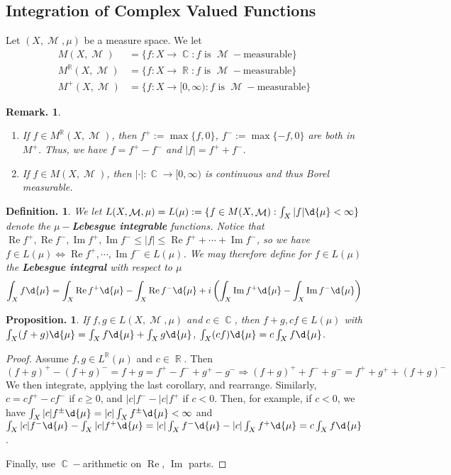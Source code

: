 \documentclass[11pt, a4paper]{memoir}
\DeclareMathOperator{\R}{{\mathbb{R}}}
\DeclareMathOperator{\C}{{\mathbb{C}}}
\theoremstyle{change}
\newtheorem{proposition}[theorem]{Proposition.}
\theoremstyle{plain}
\theoremstyle{nonumberplain}
\newtheorem{definition}{Definition.}
\newtheorem{remark}{Remark.}
\newtheorem{proof}{Proof}
\DeclareMathOperator{\M}{{\mathcal{M}}}
\renewcommand{\Re}{\ensuremath{\operatorname{Re}}}
\renewcommand{\Im}{\ensuremath{\operatorname{Im}}}
\begin{document}
\subsection{Integration of Complex Valued Functions}
Let $(X,\M,\mu)$ be a measure space.
We let
\begin{align*}
    M(X,\M)&=\{f:X\to\C:f\text{ is $\M-$measurable}\}\\
    M^{\R}(X,\M)&=\{f:X\to\R:f\text{ is $\M-$measurable}\}\\
    M^+(X,\M)&=\{f:X\to[0,\infty):f\text{ is $\M-$measurable}\}
\end{align*}
\begin{remark}
    \begin{enumerate}
        \item If $f\in M^{\R}(X,\M)$, then $f^+:=\max\{f,0\}$, $f^-:=\max\{-f,0\}$ are both in $M^+$.
            Thus, we have $f=f^+-f^-$ and $|f|=f^++f^-$.
        \item If $f\in M(X,\M)$, then $|\cdot|:\C\to[0,\infty)$ is continuous and thus Borel measurable. %
    \end{enumerate}
\end{remark}
\begin{definition}
    We let $L(X,\M,\mu)=L(\mu):=\{f\in M(X,\M):\int_X|f|\d{\mu}<\infty\}$ denote the \textbf{$\mu-$Lebesgue integrable} functions.
    Notice that $\Re f^+,\Re f^-,\Im f^+,\Im f^-\leq |f|\leq\Re f^++\cdots+\Im f^-$, so we have $f\in L(\mu)\Leftrightarrow \Re f^+,\cdots,\Im f^-\in L(\mu)$.
    We may therefore define for $f\in L(\mu)$ the \textbf{Lebesgue integral} with respect to $\mu$
    \begin{equation*}
        \int_X f\d{\mu}=\int_X\Re f^+\d{\mu}-\int_X\Re f^-\d{\mu}+i\left(\int_X\Im f^+\d{\mu}-\int_X\Im f^-\d{\mu}\right)
    \end{equation*}
\end{definition}
\begin{proposition}
    If $f,g\in L(X,\M,\mu)$ and $c\in\C$, then $f+g,cf\in L(\mu)$ with $\int_X(f+g)\d{\mu}=\int_X f\d{\mu}+\int_X g\d{\mu}$, $\int_X(cf)\d{\mu}=c\int_X f\d{\mu}$.
\end{proposition}
\begin{proof}
    Assume $f,g\in L^{\R}(\mu)$ and $c\in\R$.
    Then
    \begin{equation*}
        (f+g)^+-(f+g)^-=f+g=f^+-f^-+g^+-g^-\Rightarrow(f+g)^++f^-+g^-=f^++g^++(f+g)^-
    \end{equation*}
    We then integrate, applying the last corollary, and rearrange.
    Similarly, $c=cf^+-cf^-$ if $c\geq 0$, and $|c|f^--|c|f^+$ if $c<0$.
    Then, for example, if $c<0$, we have $\int_X|c|f^\pm\d{\mu}=|c|\int_Xf^{\pm}\d{\mu}<\infty$ and $\int_X|c|f^-\d{\mu}-\int_X|c|f^+\d{\mu}=|c|\int_X f^-\d{\mu}-|c|\int_X f^+\d{\mu}=c\int_Xf\d{\mu}$.

    Finally, use $\C-$arithmetic on $\Re$, $\Im$ parts.
\end{proof}
\end{document}

